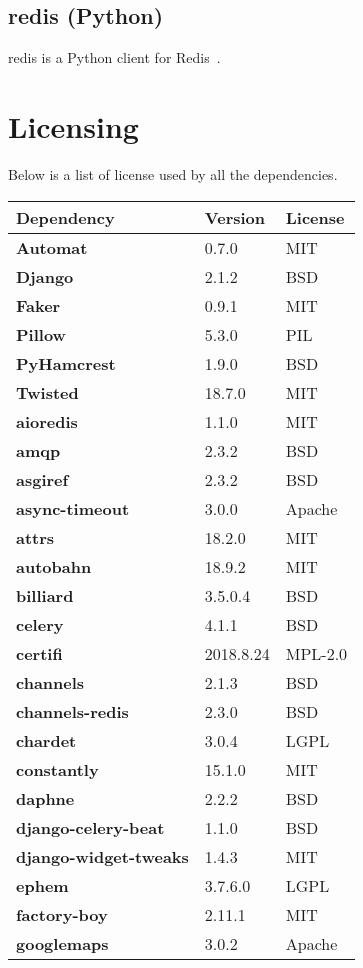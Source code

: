 \subsection{redis (Python)}
redis is a Python client for Redis~\cite{python-redis}.

\section{Licensing}
Below is a list of license used by all the dependencies.
\begin{longtable}{| p{} | p{} | p{} |}
\hline
\textbf{Dependency} & \textbf{Version} & \textbf{License} \\ \hline
\textbf{Automat} & 0.7.0 & MIT \\
\textbf{Django} & 2.1.2 & BSD \\
\textbf{Faker} & 0.9.1 & MIT \\
\textbf{Pillow} & 5.3.0 & PIL \\
\textbf{PyHamcrest} & 1.9.0 & BSD \\
\textbf{Twisted} & 18.7.0 & MIT \\
\textbf{aioredis} & 1.1.0 & MIT \\
\textbf{amqp} & 2.3.2 & BSD \\
\textbf{asgiref} & 2.3.2 & BSD \\
\textbf{async-timeout} & 3.0.0 & Apache \\
\textbf{attrs} & 18.2.0 & MIT \\
\textbf{autobahn} & 18.9.2 & MIT \\
\textbf{billiard} & 3.5.0.4 & BSD \\
\textbf{celery} & 4.1.1 & BSD \\
\textbf{certifi} & 2018.8.24 & MPL-2.0 \\
\textbf{channels} & 2.1.3 & BSD \\
\textbf{channels-redis} & 2.3.0 & BSD \\
\textbf{chardet} & 3.0.4 & LGPL \\
\textbf{constantly} & 15.1.0 & MIT \\
\textbf{daphne} & 2.2.2 & BSD \\
\textbf{django-celery-beat} & 1.1.0 & BSD \\
\textbf{django-widget-tweaks} & 1.4.3 & MIT \\
\textbf{ephem} & 3.7.6.0 & LGPL \\
\textbf{factory-boy} & 2.11.1 & MIT \\
\textbf{googlemaps} & 3.0.2 & Apache \\

\end{longtable}
